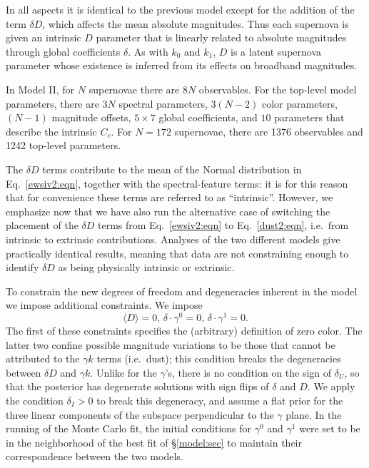 \documentclass{aastex61}   	%
\begin{document}
In all aspects it is identical to the previous model except for the addition of the term $\delta D$,
which affects the mean
absolute magnitudes.  Thus
each supernova is given an intrinsic $D$ parameter that is linearly related to
absolute magnitudes through global coefficients $\delta$.  As with $k_0$ and $k_1$,  $D$ is a latent supernova parameter whose existence is inferred from
its effects on broadband magnitudes.


In Model II, for $N$ supernovae there are $8N$ observables.  For the top-level model parameters, there are $3N$ spectral parameters, $3(N-2)$
color parameters, $(N-1)$ magnitude offsets,  $5 \times 7$ global coefficients, and $10$ parameters that describe the intrinsic
$C_c$.  For $N=172$ supernovae, there are 1376 observables and 1242 top-level parameters.


The $\delta D$ terms contribute to the mean of the Normal distribution in Eq.~\ref{ewsiv2:eqn}, together with the spectral-feature terms:
it is for this reason that for convenience these terms are referred to as ``intrinsic''.
However, we emphasize now that we have also run the alternative case  of switching the placement of the
$\delta D$ terms from Eq.~\ref{ewsiv2:eqn} to Eq.~\ref{dust2:eqn}, i.e.\ from intrinsic to extrinsic contributions.
Analyses of the two different models give practically identical results, meaning that data are not constraining enough
to identify $\delta D$ as being physically intrinsic or extrinsic.


To constrain the new degrees of freedom and degeneracies inherent in the model we impose additional constraints. We impose
\begin{equation}
\langle D\rangle=0,\,  \delta \cdot \gamma^0=0,\, \delta \cdot \gamma^1=0.
\end{equation}
The first of these constraints specifies the (arbitrary) definition of zero color.   The latter two confine possible magnitude
variations to be those that cannot be attributed to 
the $\gamma k$ terms (i.e.\ dust); this condition breaks the degeneracies between $\delta D$  
and $\gamma k$. 
Unlike for the $\gamma$'s, there is no condition on the sign of $\delta_U$,
so that the posterior has degenerate solutions with sign flips of $\delta$ and $D$.
We apply the condition $\delta_I>0$ to break this degeneracy,
and assume a flat prior for the three linear components of the subspace perpendicular to the $\gamma$ plane.
In the running of the Monte Carlo fit, the initial conditions for
$\gamma^0$ and $\gamma^1$ were set to be in the neighborhood of the best fit of \S\ref{model:sec}
to maintain their correspondence between the two models. 
\end{document}
